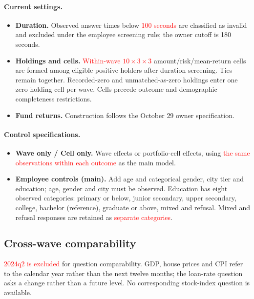 \documentclass[11pt,letterpaper,english,final]{article}
\begin{document}
\paragraph{Current settings.}
\begin{itemize}
\item \textbf{Duration.} Observed answer times below \textcolor{red}{100 seconds} are classified as invalid and excluded under the employee screening rule; the owner cutoff is 180 seconds.
\item \textbf{Holdings and cells.} \textcolor{red}{Within-wave $10\times3\times3$} amount/risk/mean-return cells are formed among eligible positive holders after duration screening. Ties remain together. Recorded-zero and unmatched-as-zero holdings enter one zero-holding cell per wave. Cells precede outcome and demographic completeness restrictions.
\item \textbf{Fund returns.} Construction follows the October 29 owner specification.
\end{itemize}

\paragraph{Control specifications.}
\begin{itemize}
\item \textbf{Wave only / Cell only.} Wave effects or portfolio-cell effects, using \textcolor{red}{the same observations within each outcome} as the main model.
\item \textbf{Employee controls (main).} Add age and categorical gender, city tier and education; age, gender and city must be observed. Education has eight observed categories: primary or below, junior secondary, upper secondary, college, bachelor (reference), graduate or above, mixed and refusal. Mixed and refusal responses are retained as \textcolor{red}{separate categories}.
\end{itemize}

\subsection{Cross-wave comparability}
\textcolor{red}{2024q2 is excluded} for question comparability. GDP, house prices and CPI refer to the calendar year rather than the next twelve months; the loan-rate question asks a change rather than a future level. No corresponding stock-index question is available.
\end{document}
